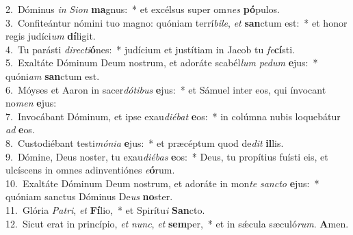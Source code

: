 {2.~}Dóminus \textit{in} \textit{Si}\textit{on} \textbf{ma}gnus:~* et excélsus super om\textit{nes} \textbf{pó}pulos.\\
{3.~}Confiteántur nómini tuo magno: quóniam terrí\textit{bi}\textit{le}, \textit{et} \textbf{san}ctum est:~* et honor regis judíci\textit{um} \textbf{dí}ligit.\\
{4.~}Tu parásti \textit{di}\textit{re}\textit{cti}\textbf{ó}nes:~* judícium et justítiam in Jacob tu \textit{fe}\textbf{cí}sti.\\
{5.~}Exaltáte Dóminum Deum nostrum, et adoráte scabél\textit{lum} \textit{pe}\textit{dum} \textbf{e}jus:~* quóni\textit{am} \textbf{san}ctum est.\\
{6.~}Móyses et Aaron in sacer\textit{dó}\textit{ti}\textit{bus} \textbf{e}jus:~* et Sámuel inter eos, qui ínvocant no\textit{men} \textbf{e}jus:\\
{7.~}Invocábant Dóminum, et ipse exau\textit{di}\textit{é}\textit{bat} \textbf{e}os:~* in colúmna nubis loquebátur \textit{ad} \textbf{e}os.\\
{8.~}Custodiébant testi\textit{mó}\textit{ni}\textit{a} \textbf{e}jus:~* et præcéptum quod de\textit{dit} \textbf{il}lis.\\
{9.~}Dómine, Deus noster, tu exau\textit{di}\textit{é}\textit{bas} \textbf{e}os:~* Deus, tu propítius fuísti eis, et ulcíscens in omnes adinventiónes \textit{e}\textbf{ó}rum.\\
{10.~}Exaltáte Dóminum Deum nostrum, et adoráte in mon\textit{te} \textit{san}\textit{cto} \textbf{e}jus:~* quóniam sanctus Dóminus De\textit{us} \textbf{no}ster.\\
{11.~}Glória \textit{Pa}\textit{tri}, \textit{et} \textbf{Fí}lio,~* et Spirítu\textit{i} \textbf{San}cto.\\
{12.~}Sicut erat in princípio, \textit{et} \textit{nunc}, \textit{et} \textbf{sem}per,~* et in sǽcula sæculó\textit{rum}. \textbf{A}men.\\
